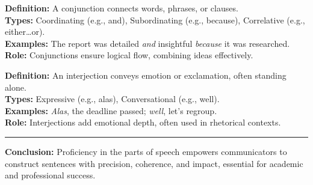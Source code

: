 \documentclass[a4paper,11pt]{article}
\begin{document}
\begin{tcolorbox}[colback=lightgray, colframe=navyblue, sharp corners, boxrule=0.5mm, title=\textbf{7. Conjunction: The Linker}, boxsep=2pt, left=2pt, right=2pt, top=2pt, bottom=2pt]
    \footnotesize \textbf{Definition:} A conjunction connects words, phrases, or clauses. \\
    \textbf{Types:} Coordinating (e.g., and), Subordinating (e.g., because), Correlative (e.g., either…or). \\
    \textbf{Examples:} The report was detailed \textit{and} insightful \textit{because} it was researched. \\
    \textbf{Role:} Conjunctions ensure logical flow, combining ideas effectively.
\end{tcolorbox}

\begin{tcolorbox}[colback=lightgray, colframe=navyblue, sharp corners, boxrule=0.5mm, title=\textbf{8. Interjection: The Expression of Emotion}, boxsep=2pt, left=2pt, right=2pt, top=2pt, bottom=2pt]
    \footnotesize \textbf{Definition:} An interjection conveys emotion or exclamation, often standing alone. \\
    \textbf{Types:} Expressive (e.g., alas), Conversational (e.g., well). \\
    \textbf{Examples:} \textit{Alas}, the deadline passed; \textit{well}, let’s regroup. \\
    \textbf{Role:} Interjections add emotional depth, often used in rhetorical contexts.
\end{tcolorbox}

\vspace{0.2cm}
\begin{center}
    \hrule height 1pt
    \vspace{0.1cm}
    {\footnotesize\color{navyblue} \textbf{Conclusion:} Proficiency in the parts of speech empowers communicators to construct sentences with precision, coherence, and impact, essential for academic and professional success.}
\end{center}
\end{document}
